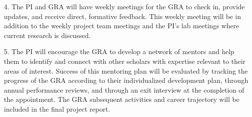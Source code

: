 \documentclass[12pt]{article}
\begin{document}
4. The PI and GRA will have weekly meetings for the GRA to check in, provide updates, and receive direct, formative feedback. This weekly meeting will be in addition to the weekly project team meetings and the PI's lab meetings where current research is discussed.

5. The PI will encourage the GRA to develop a network of mentors and help them to identify and connect with other scholars with expertise relevant to their areas of interest. Success of this mentoring plan will be evaluated by tracking the progress of the GRA according to their individualized development plan, through annual performance reviews, and through an exit interview at the completion of the appointment. The GRA subsequent activities and career trajectory will be included in the final project report.
\end{document}
